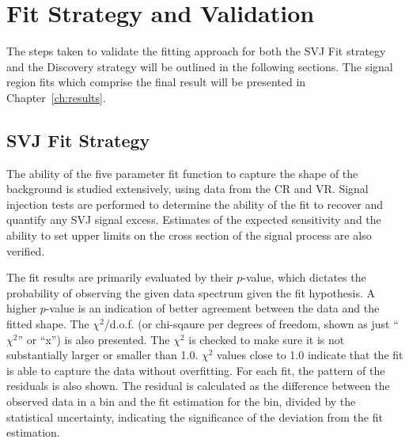 \section{Fit Strategy and Validation}
\label{sec:fit_strategy}

The steps taken to validate the fitting approach for both the SVJ Fit strategy and the Discovery strategy will be outlined in the following sections. The signal region fits which comprise the final result will be presented in Chapter~\ref{ch:results}.

\subsection{SVJ Fit Strategy}
\label{subsec:fit_exclusion}

The ability of the five parameter fit function to capture the shape of the background is studied extensively, using data from the CR and VR. Signal injection tests are performed to determine the ability of the fit to recover and quantify any SVJ signal excess. Estimates of the expected sensitivity and the ability to set upper limits on the cross section of the signal process are also verified.\par

The fit results are primarily evaluated by their $p$-value, which dictates the probability of observing the given data spectrum given the fit hypothesis.
A higher $p$-value is an indication of better agreement between the data and the fitted shape. 
The $\chi^2$/d.o.f. (or chi-sqaure per degrees of freedom, shown as just ``$\chi^2$'' or ``x'') is also presented.
The $\chi^2$ is checked to make sure it is not substantially larger or smaller than 1.0. 
$\chi^2$ values close to 1.0 indicate that the fit is able to capture the data without overfitting.
For each fit, the pattern of the residuals is also shown.
The residual is calculated as the difference between the observed data in a bin and the fit estimation for the bin, divided by the statistical uncertainty, indicating the significance of the deviation from the fit estimation.

